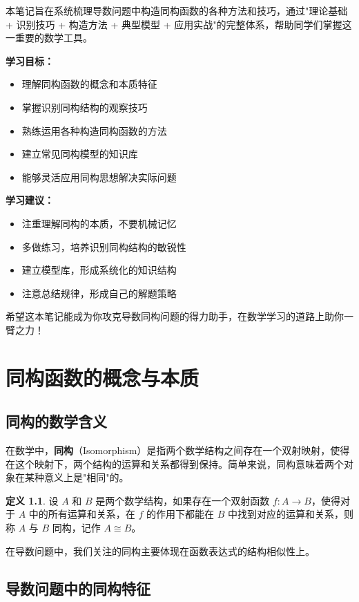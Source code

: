 \documentclass[a4paper,11pt]{ctexrep}
\newcommand{\isomorphic}{\cong}
\newcommand{\warningicon}{\ModeBadge[highlight]{注意}}
\newcommand{\keyicon}{\ModeBadge[accent]{关键}}
\theoremstyle{definition}
\newtheorem{definition}{定义}[chapter]
\begin{document}
本笔记旨在系统梳理导数问题中构造同构函数的各种方法和技巧，通过"理论基础 + 识别技巧 + 构造方法 + 典型模型 + 应用实战"的完整体系，帮助同学们掌握这一重要的数学工具。

\keyicon \textbf{学习目标：}
\begin{itemize}
    \item 理解同构函数的概念和本质特征
    \item 掌握识别同构结构的观察技巧
    \item 熟练运用各种构造同构函数的方法
    \item 建立常见同构模型的知识库
    \item 能够灵活应用同构思想解决实际问题
\end{itemize}

\warningicon \textbf{学习建议：}
\begin{itemize}
    \item 注重理解同构的本质，不要机械记忆
    \item 多做练习，培养识别同构结构的敏锐性
    \item 建立模型库，形成系统化的知识结构
    \item 注意总结规律，形成自己的解题策略
\end{itemize}

希望这本笔记能成为你攻克导数同构问题的得力助手，在数学学习的道路上助你一臂之力！

\chapter{同构函数的概念与本质}

\section{同构的数学含义}

在数学中，\textbf{同构}（Isomorphism）是指两个数学结构之间存在一个双射映射，使得在这个映射下，两个结构的运算和关系都得到保持。简单来说，同构意味着两个对象在某种意义上是"相同"的。

\begin{definition}
设 $A$ 和 $B$ 是两个数学结构，如果存在一个双射函数 $f: A \to B$，使得对于 $A$ 中的所有运算和关系，在 $f$ 的作用下都能在 $B$ 中找到对应的运算和关系，则称 $A$ 与 $B$ 同构，记作 $A \isomorphic B$。
\end{definition}

在导数问题中，我们关注的同构主要体现在函数表达式的结构相似性上。

\section{导数问题中的同构特征}
\end{document}
